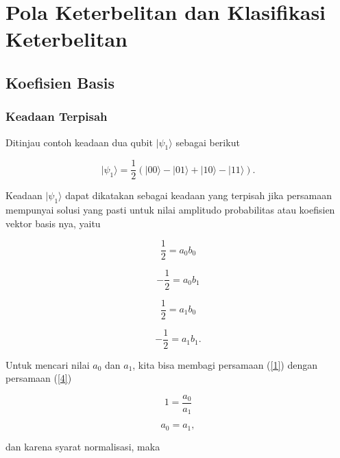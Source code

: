 \section{Pola Keterbelitan dan Klasifikasi Keterbelitan}

\subsection{Koefisien Basis}

\subsubsection{Keadaan Terpisah}

Ditinjau contoh keadaan dua qubit $|\psi_1\rangle$ sebagai berikut

\begin{equation}
|\psi_1\rangle =
\frac{1}{2}
\left(
|00\rangle - |01\rangle + |10\rangle - |11\rangle
\right).
\end{equation}

Keadaan $|\psi_1\rangle$ dapat dikatakan sebagai keadaan yang terpisah jika persamaan mempunyai solusi yang pasti untuk nilai amplitudo probabilitas atau koefisien vektor
basis nya, yaitu

\begin{equation}\label{1}
\frac{1}{2} = a_0 b_0
\end{equation}

\begin{equation}\label{2}
-\frac{1}{2} = a_0 b_1
\end{equation}

\begin{equation}\label{3}
\frac{1}{2} = a_1 b_0
\end{equation}

\begin{equation}\label{4}
-\frac{1}{2} = a_1 b_1.
\end{equation}

Untuk mencari nilai $a_0$ dan $a_1$, kita bisa membagi persamaan (\ref{1}) dengan persamaan (\ref{4})

\begin{equation}
1 = \frac{a_0}{a_1}
\end{equation}

\begin{equation}
a_0 = a_1,
\end{equation}

dan karena syarat normalisasi, maka

